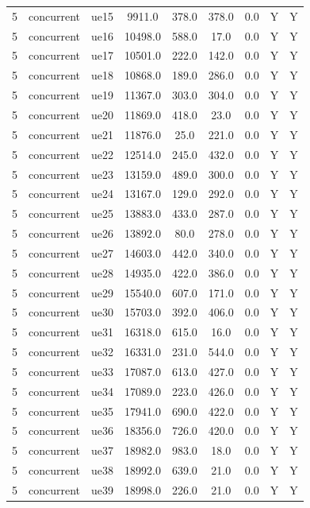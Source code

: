 \begin{table}[ht]
\begin{tabular}{|c|c|c|c|c|c|c|c|c|}
5 & concurrent & ue15 & 9911.0 & 378.0 & 378.0 & 0.0 & Y & Y \\
5 & concurrent & ue16 & 10498.0 & 588.0 & 17.0 & 0.0 & Y & Y \\
5 & concurrent & ue17 & 10501.0 & 222.0 & 142.0 & 0.0 & Y & Y \\
5 & concurrent & ue18 & 10868.0 & 189.0 & 286.0 & 0.0 & Y & Y \\
5 & concurrent & ue19 & 11367.0 & 303.0 & 304.0 & 0.0 & Y & Y \\
5 & concurrent & ue20 & 11869.0 & 418.0 & 23.0 & 0.0 & Y & Y \\
5 & concurrent & ue21 & 11876.0 & 25.0 & 221.0 & 0.0 & Y & Y \\
5 & concurrent & ue22 & 12514.0 & 245.0 & 432.0 & 0.0 & Y & Y \\
5 & concurrent & ue23 & 13159.0 & 489.0 & 300.0 & 0.0 & Y & Y \\
5 & concurrent & ue24 & 13167.0 & 129.0 & 292.0 & 0.0 & Y & Y \\
5 & concurrent & ue25 & 13883.0 & 433.0 & 287.0 & 0.0 & Y & Y \\
5 & concurrent & ue26 & 13892.0 & 80.0 & 278.0 & 0.0 & Y & Y \\
5 & concurrent & ue27 & 14603.0 & 442.0 & 340.0 & 0.0 & Y & Y \\
5 & concurrent & ue28 & 14935.0 & 422.0 & 386.0 & 0.0 & Y & Y \\
5 & concurrent & ue29 & 15540.0 & 607.0 & 171.0 & 0.0 & Y & Y \\
5 & concurrent & ue30 & 15703.0 & 392.0 & 406.0 & 0.0 & Y & Y \\
5 & concurrent & ue31 & 16318.0 & 615.0 & 16.0 & 0.0 & Y & Y \\
5 & concurrent & ue32 & 16331.0 & 231.0 & 544.0 & 0.0 & Y & Y \\
5 & concurrent & ue33 & 17087.0 & 613.0 & 427.0 & 0.0 & Y & Y \\
5 & concurrent & ue34 & 17089.0 & 223.0 & 426.0 & 0.0 & Y & Y \\
5 & concurrent & ue35 & 17941.0 & 690.0 & 422.0 & 0.0 & Y & Y \\
5 & concurrent & ue36 & 18356.0 & 726.0 & 420.0 & 0.0 & Y & Y \\
5 & concurrent & ue37 & 18982.0 & 983.0 & 18.0 & 0.0 & Y & Y \\
5 & concurrent & ue38 & 18992.0 & 639.0 & 21.0 & 0.0 & Y & Y \\
5 & concurrent & ue39 & 18998.0 & 226.0 & 21.0 & 0.0 & Y & Y \\

\end{tabular}
\end{table}
